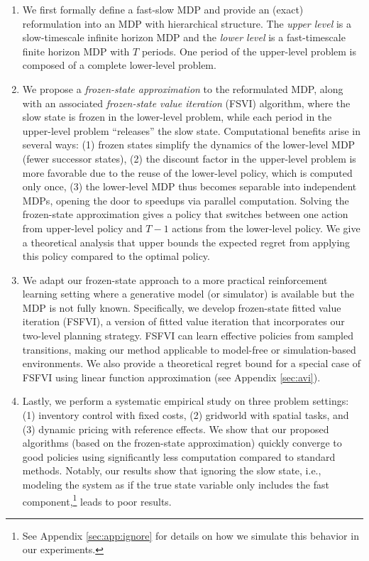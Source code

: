 \documentclass[11pt, notitlepage]{article}
\newcommand{\1}{\mathbbm{1}}
\begin{document}
\begin{enumerate}
    \item We first formally define a fast-slow MDP and provide an (exact) reformulation into an MDP with hierarchical structure. The \emph{upper level} is a slow-timescale infinite horizon MDP and the \emph{lower level} is a fast-timescale finite horizon MDP with $T$ periods. One period of the upper-level problem is composed of a complete lower-level problem. 
    \item We propose a \emph{frozen-state approximation} to the reformulated MDP, along with an associated \emph{frozen-state value iteration} (FSVI) algorithm, where the slow state is frozen in the lower-level problem, while each period in the upper-level problem ``releases'' the slow state. Computational benefits arise in several ways: (1) frozen states simplify the dynamics of the lower-level MDP (fewer successor states), (2) the discount factor in the upper-level problem is more favorable due to the reuse of the lower-level policy, which is computed only once, (3) the lower-level MDP thus becomes separable into independent MDPs, opening the door to speedups via parallel computation. Solving the frozen-state approximation gives a policy that switches between one action from upper-level policy and $T-1$ actions from the lower-level policy. We give a theoretical analysis that upper bounds the expected regret from applying this policy compared to the optimal policy.
    
    
        
    \item We adapt our frozen-state approach to a more practical reinforcement learning setting where a generative model (or simulator) is available but the MDP is not fully known. Specifically, we develop frozen-state fitted value iteration (FSFVI), a version of fitted value iteration \citep{munos2008finite} that incorporates our two-level planning strategy. FSFVI can learn effective policies from sampled transitions, making our method applicable to model-free or simulation-based environments. We also provide a theoretical regret bound for a special case of FSFVI using linear function approximation (see Appendix \ref{sec:avi}).

    \item Lastly, we perform a systematic empirical study on three problem settings: (1) inventory control with fixed costs, (2) gridworld with spatial tasks, and (3) dynamic pricing with reference effects. We show that our proposed algorithms (based on the frozen-state approximation) quickly converge to good policies using significantly less computation compared to standard methods. Notably, our results show that ignoring the slow state, i.e., modeling the system as if the true state variable only includes the fast component,\footnote{See Appendix \ref{sec:app:ignore} for details on how we simulate this behavior in our experiments.} leads to poor results.
\end{enumerate}
\end{document}
